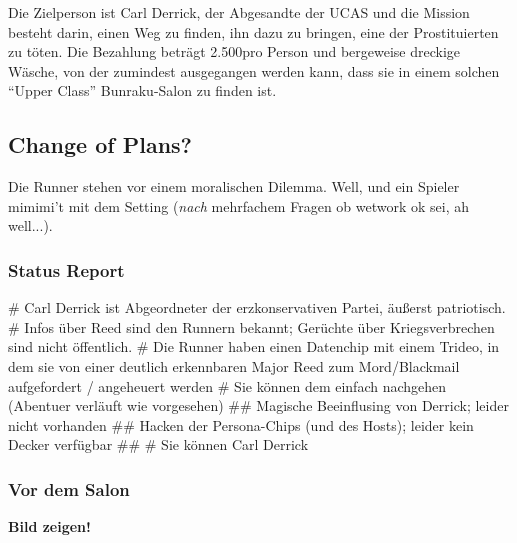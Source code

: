 Die Zielperson ist Carl Derrick, der Abgesandte der UCAS und die Mission besteht darin, einen Weg zu finden, ihn dazu zu bringen, eine der Prostituierten zu töten. Die Bezahlung beträgt 2.500\nuyen pro Person und bergeweise dreckige Wäsche, von der zumindest ausgegangen werden kann, dass sie in einem solchen ``Upper Class'' Bunraku-Salon zu finden ist. 



\subsection{Change of Plans?}

Die Runner stehen vor einem moralischen Dilemma. Well, und ein Spieler mimimi't mit dem Setting (\textit{nach} mehrfachem Fragen ob wetwork ok sei, ah well...).

\subsubsection{Status Report}

\begin{easylist}
    # Carl Derrick ist Abgeordneter der erzkonservativen Partei, äußerst patriotisch.
    # Infos über Reed sind den Runnern bekannt; Gerüchte über Kriegsverbrechen sind nicht öffentlich.
    # Die Runner haben einen Datenchip mit einem Trideo, in dem sie von einer deutlich erkennbaren Major Reed zum Mord/Blackmail aufgefordert / angeheuert werden
    # Sie können dem einfach nachgehen (Abentuer verläuft wie vorgesehen)
    ## Magische Beeinflusing von Derrick; leider nicht vorhanden
    ## Hacken der Persona-Chips (und des Hosts); leider kein Decker verfügbar
    ## 
    # Sie können Carl Derrick
\end{easylist}


\subsubsection{Vor dem Salon}


\textbf{Bild zeigen!} 

